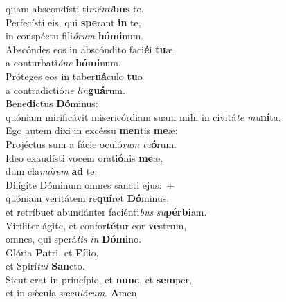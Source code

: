 \oddverse quam abscondísti ti\textit{mén}\textit{ti}\textbf{bus} te.\\
\evenverse Perfecísti eis, qui \textbf{spe}rant \textbf{in} te,~\*\\
\evenverse in conspéctu fili\textit{ó}\textit{rum} \textbf{hó}\textbf{mi}num.\\
\oddverse Abscóndes eos in abscóndito faci\textbf{é}i \textbf{tu}æ~\*\\
\oddverse a conturbati\textit{ó}\textit{ne} \textbf{hó}\textbf{mi}num.\\
\evenverse Próteges eos in taber\textbf{ná}culo \textbf{tu}o~\*\\
\evenverse a contradictió\textit{ne} \textit{lin}\textbf{guá}rum.\\
\oddverse Bene\textbf{dí}ctus \textbf{Dó}minus:~\*\\
\oddverse quóniam mirificávit misericórdiam suam mihi in civitá\textit{te} \textit{mu}\textbf{ní}ta.\\
\evenverse Ego autem dixi in excéssu \textbf{men}tis \textbf{me}æ:~\*\\
\evenverse Projéctus sum a fácie oculó\textit{rum} \textit{tu}\textbf{ó}rum.\\
\oddverse Ideo exaudísti vocem orati\textbf{ó}nis \textbf{me}æ,~\*\\
\oddverse dum cla\textit{má}\textit{rem} \textbf{ad} te.\\
\evenverse Dilígite Dóminum omnes sancti ejus:~+\\
\evenverse  quóniam veritátem re\textbf{quí}ret \textbf{Dó}minus,~\*\\
\evenverse et retríbuet abundánter faciénti\textit{bus} \textit{su}\textbf{pér}\textbf{bi}am.\\
\oddverse Viríliter ágite, et confor\textbf{té}tur cor \textbf{ve}strum,~\*\\
\oddverse omnes, qui sperá\textit{tis} \textit{in} \textbf{Dó}\textbf{mi}no.\\
\evenverse Glória \textbf{Pa}tri, et \textbf{Fí}lio,~\*\\
\evenverse et Spirí\textit{tu}\textit{i} \textbf{San}cto.\\
\oddverse Sicut erat in princípio, et \textbf{nunc}, et \textbf{sem}per,~\*\\
\oddverse et in sǽcula sæcu\textit{ló}\textit{rum}. \textbf{A}men.\\
